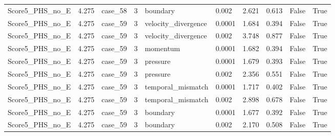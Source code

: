 \begin{longtable}{llllllllll}
Score5\_PHS\_no\_E & 4.275 & case\_58 & 3 & boundary & 0.002 & 2.621 & 0.613 & False & True \\
Score5\_PHS\_no\_E & 4.275 & case\_59 & 3 & velocity\_divergence & 0.0001 & 1.684 & 0.394 & False & True \\
Score5\_PHS\_no\_E & 4.275 & case\_59 & 3 & velocity\_divergence & 0.002 & 3.748 & 0.877 & False & True \\
Score5\_PHS\_no\_E & 4.275 & case\_59 & 3 & momentum & 0.0001 & 1.682 & 0.394 & False & True \\
Score5\_PHS\_no\_E & 4.275 & case\_59 & 3 & pressure & 0.0001 & 1.679 & 0.393 & False & True \\
Score5\_PHS\_no\_E & 4.275 & case\_59 & 3 & pressure & 0.002 & 2.356 & 0.551 & False & True \\
Score5\_PHS\_no\_E & 4.275 & case\_59 & 3 & temporal\_mismatch & 0.0001 & 1.717 & 0.402 & False & True \\
Score5\_PHS\_no\_E & 4.275 & case\_59 & 3 & temporal\_mismatch & 0.002 & 2.898 & 0.678 & False & True \\
Score5\_PHS\_no\_E & 4.275 & case\_59 & 3 & boundary & 0.0001 & 1.677 & 0.392 & False & True \\
Score5\_PHS\_no\_E & 4.275 & case\_59 & 3 & boundary & 0.002 & 2.170 & 0.508 & False & True \\
\end{longtable}
